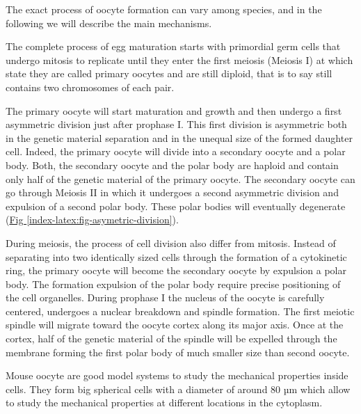 \documentclass[A4paperpaper,11pt,english]{sphinxmanual}
\begin{document}
The exact process of oocyte formation can vary among species, and in the following we will
describe the main mechanisms.

The complete process of egg maturation starts with primordial germ cells that
undergo mitosis to replicate until they enter the first meiosis (Meiosis I)
at which state they are called primary oocytes and are still diploid, that is to say still contains two chromosomes of each pair.

The primary oocyte will start maturation and growth and then undergo a first
asymmetric division just after prophase I.  This first division is asymmetric
both in the genetic material separation and in the unequal size of the formed
daughter cell. Indeed, the primary oocyte will divide into a secondary oocyte
and a polar body. Both, the secondary oocyte and the polar body are haploid and contain
only half of the genetic material of the primary oocyte.  The secondary oocyte
can go through Meiosis II in which it undergoes a second asymmetric division
and expulsion of a second polar body. These polar bodies will eventually degenerate
(\hyperref[index-latex:fig-asymetric-division]{Fig  \ref*{index-latex:fig-asymetric-division}}).

During meiosis, the process of cell division also differ from mitosis. Instead
of separating into two identically sized cells through the formation of a
cytokinetic ring, the primary oocyte will become the secondary oocyte by
expulsion a polar body. The formation expulsion of the polar body require
precise positioning of the cell organelles. During prophase I the nucleus of
the oocyte is carefully centered, undergoes a nuclear breakdown and spindle formation.
The first meiotic spindle will migrate toward the oocyte cortex along
its major axis. Once at the cortex, half of the genetic material of the spindle
will be expelled through the membrane forming the first polar body of much
smaller size than second oocyte.

Mouse oocyte are good model systems to study the mechanical properties inside
cells. They form big spherical cells with a diameter of around 80 µm
which allow to study the mechanical properties at different locations in
the cytoplasm.
\end{document}

